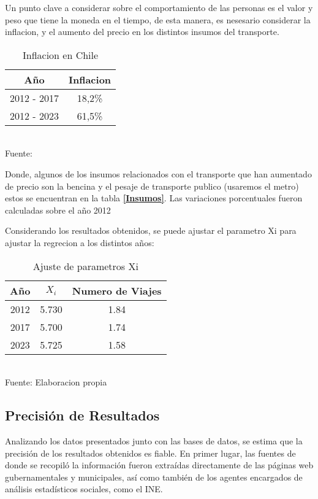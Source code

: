 \documentclass[12pt]{article} %
\begin{document}
Un punto clave a considerar sobre el comportamiento de las personas es el valor y peso que tiene la moneda en el tiempo, de esta manera, es nesesario considerar la inflacion, y el aumento del precio en los distintos insumos del transporte.

\begin{table}[H]
    \centering
    \caption{Inflacion en Chile}
    \vspace{0.2cm}
    \begin{tabular}{|c|c|}
        \hline
        Año & Inflacion \\
        \hline
        2012 - 2017 & 18,2\% \\
        2012 - 2023 & 61,5\% \\
        \hline
    \end{tabular}
    \vspace{0.2cm}
    \\Fuente: \textbf{\cite{ipc}}
\end{table}

Donde, algunos de los insumos relacionados con el transporte que han aumentado de precio son la bencina y el pesaje de transporte publico (usaremos el metro) estos se encuentran en la tabla \textbf{\ref{Insumos}}. Las variaciones porcentuales fueron calculadas sobre el año 2012

Considerando los resultados obtenidos, se puede ajustar el parametro Xi para ajustar la regrecion a los distintos años:

\begin{table}[H]
    \centering
    \caption{Ajuste de parametros Xi}
    \vspace{0.2cm}
    \begin{tabular}{|c|c|c|}
        \hline
        Año & $X_i$ & Numero de Viajes \\
        \hline
        2012 & 5.730 & 1.84 \\
        2017 & 5.700 & 1.74 \\
        2023 & 5.725 & 1.58 \\
        \hline
    \end{tabular}
    \vspace{0.2cm}
    \\Fuente: Elaboracion propia
\end{table}


\subsection{Precisión de Resultados}
Analizando los datos presentados junto con las bases de datos, se estima que la precisión de los resultados obtenidos es fiable.
En primer lugar, las fuentes de donde se recopiló la información fueron extraídas directamente de las páginas web gubernamentales y municipales, 
así como también de los agentes encargados de análisis estadísticos sociales, como el INE.\\ 
\end{document}
